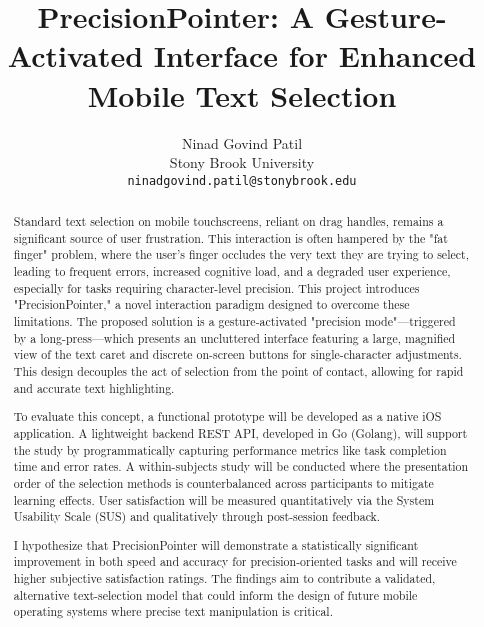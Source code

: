 \documentclass[12pt, a4paper]{article}
\title{\textbf{PrecisionPointer: A Gesture-Activated Interface for Enhanced Mobile Text Selection}}
\author{Ninad Govind Patil \\
        Stony Brook University \\
        \texttt{ninadgovind.patil@stonybrook.edu}}
\date{}
\begin{document}
\maketitle

\begin{abstract}
\noindent
Standard text selection on mobile touchscreens, reliant on drag handles, remains a significant source of user frustration. This interaction is often hampered by the "fat finger" problem, where the user's finger occludes the very text they are trying to select, leading to frequent errors, increased cognitive load, and a degraded user experience, especially for tasks requiring character-level precision. This project introduces "PrecisionPointer," a novel interaction paradigm designed to overcome these limitations. The proposed solution is a gesture-activated "precision mode"—triggered by a long-press—which presents an uncluttered interface featuring a large, magnified view of the text caret and discrete on-screen buttons for single-character adjustments. This design decouples the act of selection from the point of contact, allowing for rapid and accurate text highlighting.

To evaluate this concept, a functional prototype will be developed as a native iOS application. A lightweight backend REST API, developed in Go (Golang), will support the study by programmatically capturing performance metrics like task completion time and error rates. A within-subjects study will be conducted where the presentation order of the selection methods is counterbalanced across participants to mitigate learning effects. User satisfaction will be measured quantitatively via the System Usability Scale (SUS) and qualitatively through post-session feedback.

I hypothesize that PrecisionPointer will demonstrate a statistically significant improvement in both speed and accuracy for precision-oriented tasks and will receive higher subjective satisfaction ratings. The findings aim to contribute a validated, alternative text-selection model that could inform the design of future mobile operating systems where precise text manipulation is critical.
\end{abstract}
\end{document}
